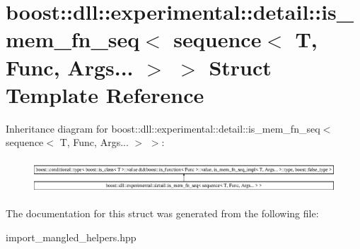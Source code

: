 \hypertarget{a01528}{}\section{boost\+:\+:dll\+:\+:experimental\+:\+:detail\+:\+:is\+\_\+mem\+\_\+fn\+\_\+seq$<$ sequence$<$ T, Func, Args... $>$ $>$ Struct Template Reference}
\label{a01528}
Inheritance diagram for boost\+:\+:dll\+:\+:experimental\+:\+:detail\+:\+:is\+\_\+mem\+\_\+fn\+\_\+seq$<$ sequence$<$ T, Func, Args... $>$ $>$\+:\begin{figure}[H]
\begin{center}
\leavevmode
\includegraphics[height=1.294798cm]{a01528}
\end{center}
\end{figure}


The documentation for this struct was generated from the following file\+:\begin{DoxyCompactItemize}
\item 
import\+\_\+mangled\+\_\+helpers.\+hpp\end{DoxyCompactItemize}
